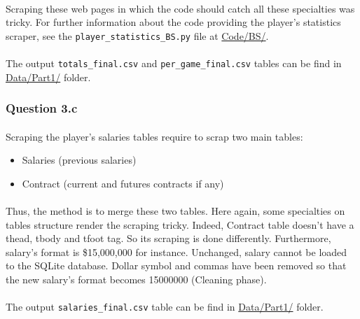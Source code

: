 \paragraph{}Scraping these web pages in which the code should catch all these specialties was tricky. For further information about the code providing the player's statistics scraper, see the \verb|player_statistics_BS.py| file at \url{Code/BS/}.

\paragraph{}The output \verb|totals_final.csv| and \verb|per_game_final.csv| tables can be find in \url{Data/Part1/} folder.

\subsubsection{Question 3.c}
\label{subsubsec:313c}

\paragraph{}Scraping the player's salaries tables require to scrap two main tables:

\begin{itemize}
	\item Salaries (previous salaries)
	\item Contract (current and futures contracts if any)
\end{itemize}

\paragraph{}Thus, the method is to merge these two tables. Here again, some specialties on tables structure render the scraping tricky. Indeed, Contract table doesn't have a thead, tbody and tfoot tag. So its scraping is done differently. Furthermore, salary's format is \$15,000,000 for instance. Unchanged, salary cannot be loaded to the SQLite database. Dollar symbol and commas have been removed so that the new salary's format becomes 15000000 (Cleaning phase).

\paragraph{}The output \verb|salaries_final.csv| table can be find in \url{Data/Part1/} folder.

